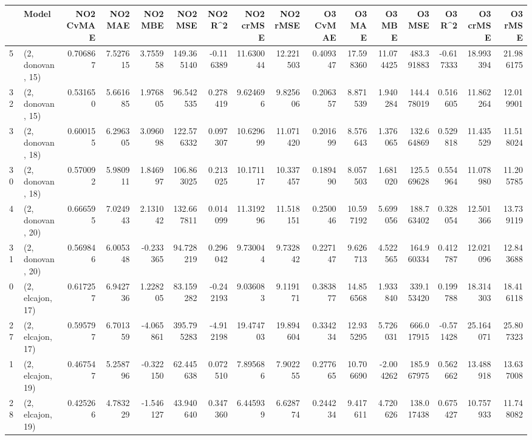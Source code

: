 \begin{tabular}{llrrrrrrrrrrrrrr}
\toprule
{} &             Model &  NO2 CvMAE &    NO2 MAE &   NO2 MBE &     NO2 MSE &   NO2 R\textasciicircum 2 &  NO2 crMSE &   NO2 rMSE &  O3 CvMAE &     O3 MAE &     O3 MBE &      O3 MSE &    O3 R\textasciicircum 2 &   O3 crMSE &    O3 rMSE \\
\midrule
5  &  (2, donovan, 15) &   0.706867 &   7.527615 &  3.755958 &  149.365140 & -0.116389 &  11.630044 &  12.221503 &  0.409347 &  17.598360 &  11.074425 &  483.391883 & -0.617333 &  18.993394 &  21.986175 \\
32 &  (2, donovan, 15) &   0.531650 &   5.661685 &  1.976805 &   96.542535 &  0.278419 &   9.624696 &   9.825606 &  0.206357 &   8.871539 &   1.940284 &  144.478019 &  0.516605 &  11.862264 &  12.019901 \\
3  &  (2, donovan, 18) &   0.600155 &   6.296305 &  3.096098 &  122.576332 &  0.097307 &  10.629699 &  11.071420 &  0.201699 &   8.576643 &   1.376065 &  132.664869 &  0.529818 &  11.435529 &  11.518024 \\
30 &  (2, donovan, 18) &   0.570092 &   5.980911 &  1.846997 &  106.863025 &  0.213025 &  10.171117 &  10.337457 &  0.189490 &   8.057503 &   1.681020 &  125.569628 &  0.554964 &  11.078980 &  11.205785 \\
4  &  (2, donovan, 20) &   0.666595 &   7.024943 &  2.131042 &  132.667811 &  0.014099 &  11.319296 &  11.518151 &  0.250046 &  10.597192 &   5.699056 &  188.763402 &  0.328054 &  12.501366 &  13.739119 \\
31 &  (2, donovan, 20) &   0.569846 &   6.005348 & -0.233365 &   94.728219 &  0.296042 &   9.730044 &   9.732842 &  0.227147 &   9.626713 &   4.522565 &  164.960334 &  0.412787 &  12.021096 &  12.843688 \\
0  &  (2, elcajon, 17) &   0.617257 &   6.942736 &  1.228205 &   83.159282 & -0.242193 &   9.036083 &   9.119171 &  0.383877 &  14.856568 &   1.933840 &  339.153420 &  0.199788 &  18.314303 &  18.416118 \\
27 &  (2, elcajon, 17) &   0.595797 &   6.701359 & -4.065861 &  395.795283 & -4.912198 &  19.474703 &  19.894604 &  0.334234 &  12.935295 &   5.726031 &  666.017915 & -0.571428 &  25.164071 &  25.807323 \\
1  &  (2, elcajon, 19) &   0.467547 &   5.258796 & -0.322150 &   62.445638 &  0.072510 &   7.895686 &   7.902255 &  0.277665 &  10.706690 &  -2.004262 &  185.967975 &  0.562662 &  13.488918 &  13.637008 \\
28 &  (2, elcajon, 19) &   0.425266 &   4.783229 & -1.546127 &   43.940640 &  0.347360 &   6.445939 &   6.628774 &  0.244234 &   9.417611 &   4.720626 &  138.017438 &  0.675427 &  10.757933 &  11.748082 \\

\end{tabular}
